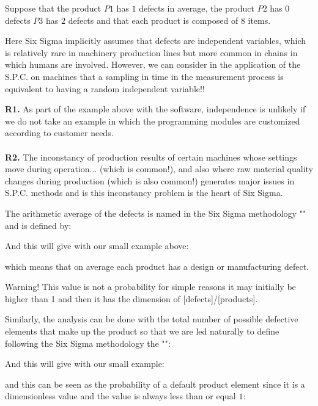 Suppose that the product $P1$ has $1$ defects in average, the product $P2$ has $0$ defects $P3$ has $2$ defects and that each product is composed of 8 items.

Here Six Sigma implicitly assumes that defects are independent variables, which is relatively rare in machinery production lines but more common in chains in which humans are involved. However, we can consider in the application of the S.P.C. on machines that a sampling in time in the measurement process is equivalent to having a random independent variable!!

	\begin{tcolorbox}[title=Remarks,colframe=black,arc=10pt]
\textbf{R1.} As part of the example above with the software, independence is unlikely if we do not take an example in which the programming modules are customized according to customer needs.\\\\
\textbf{R2.} The inconstancy of production results of certain machines whose settings move during operation... (which is common!), and also where raw material quality changes during production (which is also common!) generates major issues in S.P.C. methods and is this inconstancy problem is the heart of Six Sigma.
	\end{tcolorbox}
The arithmetic average of the defects is named in the Six Sigma methodology "" and is defined by:
	
And this will give with our small example above:
	
which means that on average each product has a design or manufacturing defect. 
	\begin{tcolorbox}[title=Remark,colframe=black,arc=10pt]
Warning! This value is not a probability for simple reasons it may initially be higher than 1 and then it has the dimension of [defects]/[products].
	\end{tcolorbox}

Similarly, the analysis can be done with the total number of possible defective elements that make up the product so that we are led naturally to define following the Six Sigma methodology the "":
	
And this will give with our small example:
	
and this can be seen as the probability of a default product element since it is a dimensionless value and the value is always less than or equal $1$:
	
